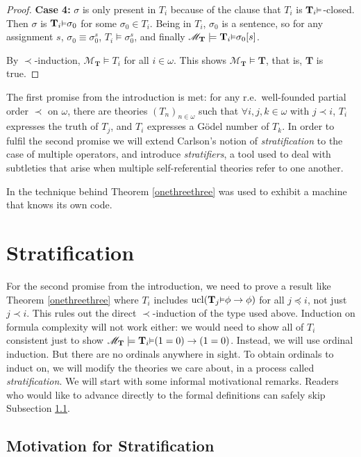 \documentclass[reqno]{article}
\theoremstyle{definition}
\def\M{\mathscr{M}}
\def\T{\mathbf{T}}
\renewcommand{\Pr}[1]{\T_{#1}\mbox{\small${\vDash}$}}
\newcommand{\ucl}[1]{\mathrm{ucl}(#1)}
\newcommand{\case}[1]{\textbf{Case #1:}}
\begin{document}
\begin{proof}
\item
\case4
$\sigma$ is only present in $T_i$ because of the clause that $T_i$
is $\Pr i$-closed.
Then $\sigma$ is $\Pr i\sigma_0$ for some $\sigma_0\in T_i$.
Being in $T_i$, $\sigma_0$ is a sentence, so for any assignment $s$,
$\sigma_0\equiv\sigma^s_0$, $T_i\models\sigma^s_0$,
and finally $\M_\T\models \Pr i\sigma_0[s]$.

\item
By $\prec$-induction, $\M_\T\models T_i$ for all $i\in\omega$.
This shows $\M_\T\models\T$, that is, $\T$ is true.
\end{proof}

The first promise from the introduction is met: for any
r.e.~well-founded partial order $\prec$ on $\omega$, there are theories
$(T_n)_{n\in\omega}$ such that $\forall i,j,k\in\omega$ with $j\prec i$, $T_i$ expresses
the truth of $T_j$, and $T_i$ expresses a G\"odel number of $T_k$.
In order to fulfil the second promise
we will extend Carlson's notion of \emph{stratification} to the case of multiple
operators, and introduce \emph{stratifiers}, a tool used to deal with subtleties
that arise when multiple self-referential theories refer to one another.

In \cite{alexandercode} the technique behind Theorem \ref{onethreethree}
was used to exhibit a machine that knows its own code.


\section{Stratification}
\label{stratificationsection}

For the second promise from the introduction, we need to prove a result
like Theorem \ref{onethreethree} where $T_i$ includes
$\ucl{\Pr j\phi\rightarrow\phi}$ for all $j\preceq i$, not just $j\prec i$.
This rules out the direct $\prec$-induction
of the type used above.  Induction on formula complexity will not work either:
we would need to show all of
$T_i$ consistent just to show $\M_\T\models\Pr i(1=0)\rightarrow(1=0)$.
Instead, we will use ordinal induction.
But there are no ordinals anywhere in sight. To obtain ordinals
to induct on, we will modify the theories we care about, in a process
called \emph{stratification}. We will start with some informal motivational
remarks. Readers who would like to advance directly to the formal definitions
can safely skip Subsection \ref{StratificationMotivationSubsection}.

\subsection{Motivation for Stratification}
\label{StratificationMotivationSubsection}
\end{document}
